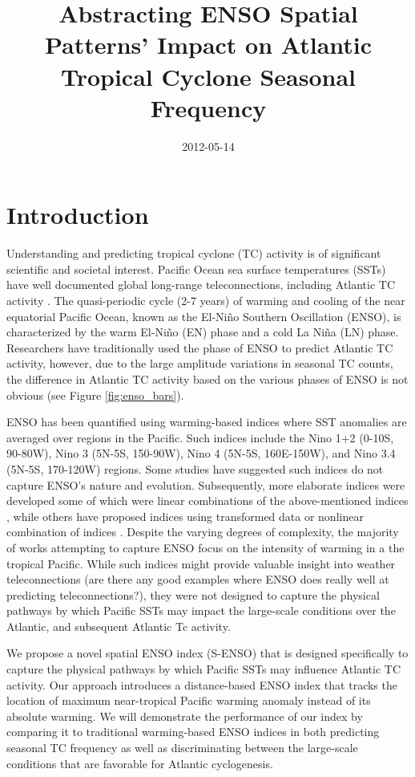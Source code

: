 \documentclass[]{article}
\title{Abstracting ENSO Spatial Patterns' Impact on Atlantic Tropical Cyclone Seasonal Frequency}
\author{  }
\date{2012-05-14}
\begin{document}
\maketitle

\begin{abstract}
\end{abstract}
\section{Introduction}
Understanding and predicting tropical cyclone (TC) activity is of significant scientific and societal interest. Pacific Ocean sea surface temperatures (SSTs) have well documented global long-range teleconnections, including Atlantic TC activity \cite{gray1984a, bove1998,elsner2001b, emanuel2008, klotzbach2011nino}. The quasi-periodic cycle (2-7 years) of warming and cooling of the near equatorial Pacific Ocean, known as the El-Ni\~no Southern Oscillation (ENSO), is characterized by the warm El-Ni\~no (EN) phase and a cold La Ni\~na (LN) phase. Researchers have traditionally used the phase of ENSO to predict Atlantic TC activity, however, due to the large amplitude variations in seasonal TC counts, the difference in Atlantic TC activity based on the various phases of ENSO is not obvious (see Figure \ref{fig:enso_bars}).

ENSO has been quantified using warming-based indices where SST anomalies are averaged over regions in the Pacific. Such indices include the Nino 1+2 (0-10S, 90-80W), Nino 3 (5N-5S, 150-90W), Nino 4 (5N-5S, 160E-150W), and Nino 3.4 (5N-5S, 170-120W) regions. Some studies have suggested such indices do not capture ENSO's nature and evolution. Subsequently, more elaborate indices were developed some of which were linear combinations of the above-mentioned indices \cite{trenberth2001}, while others have proposed indices using transformed data or nonlinear combination of indices \cite{ren2011}. Despite the varying degrees of complexity, the majority of works attempting to capture ENSO focus on the intensity of warming in a the tropical Pacific. While such indices might provide valuable insight into weather teleconnections (are there any good examples where ENSO does really well at predicting teleconnections?), they were not designed to capture the physical pathways by which Pacific SSTs may impact the large-scale conditions over the Atlantic, and subsequent Atlantic Tc activity.

We propose a novel spatial ENSO index (S-ENSO) that is designed specifically to capture the physical pathways by which Pacific SSTs may influence Atlantic TC activity. Our approach introduces a distance-based ENSO index that tracks the location of maximum near-tropical Pacific warming anomaly instead of its absolute warming. We will demonstrate the performance of our index by comparing it to traditional warming-based ENSO indices in both predicting seasonal TC frequency as well as discriminating between the large-scale conditions that are favorable for Atlantic cyclogenesis.
\end{document}
